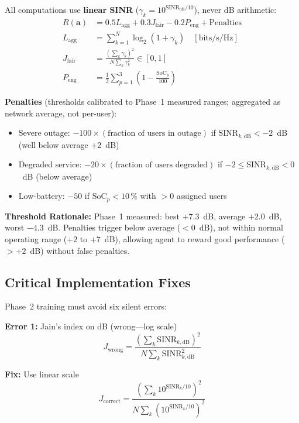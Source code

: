 \documentclass[conference]{IEEEtran}
\begin{document}
All computations use \textbf{linear SINR} ($\gamma_k = 10^{\text{SINR}_{\text{dB}}/10}$), never dB arithmetic:
\begin{align}
R(\mathbf{a}) &= 0.5 L_{\text{agg}} + 0.3 J_{\text{fair}} - 0.2 P_{\text{eng}} + \text{Penalties}\\
L_{\text{agg}} &= \sum_{k=1}^N \log_2(1 + \gamma_k) \quad [\text{bits/s/Hz}]\\
J_{\text{fair}} &= \frac{(\sum_k \gamma_k)^2}{N \sum_k \gamma_k^2} \in [0,1]\\
P_{\text{eng}} &= \frac{1}{3}\sum_{p=1}^{3} \left(1 - \frac{\text{SoC}_p}{100}\right)
\end{align}

\noindent \textbf{Penalties} (thresholds calibrated to Phase~1 measured ranges; aggregated as network average, not per-user):
\begin{itemize}\setlength{\itemsep}{0pt}
  \item Severe outage: $-100 \times (\text{fraction of users in outage})$ if $\text{SINR}_{k,\text{dB}} < -2$~dB (well below average +2~dB)
  \item Degraded service: $-20 \times (\text{fraction of users degraded})$ if $-2 \le \text{SINR}_{k,\text{dB}} < 0$~dB (below average)
  \item Low-battery: $-50$ if $\text{SoC}_p < 10\,\%$ with $> 0$ assigned users
\end{itemize}

\noindent \textbf{Threshold Rationale:} Phase~1 measured: best $+7.3$~dB, average $+2.0$~dB, worst $-4.3$~dB. Penalties trigger below average ($< 0$~dB), not within normal operating range ($+2$ to $+7$~dB), allowing agent to reward good performance ($> +2$~dB) without false penalties.

\subsection{Critical Implementation Fixes}

Phase~2 training must avoid six silent errors:

\textbf{Error 1:} Jain's index on dB (wrong---log scale)
\begin{equation}
J_{\text{wrong}} = \frac{(\sum_k \text{SINR}_{k,\text{dB}})^2}{N \sum_k \text{SINR}_{k,\text{dB}}^2}
\end{equation}

\textbf{Fix:} Use linear scale
\begin{equation}
J_{\text{correct}} = \frac{(\sum_k 10^{\text{SINR}_k/10})^2}{N \sum_k (10^{\text{SINR}_k/10})^2}
\end{equation}
\end{document}
